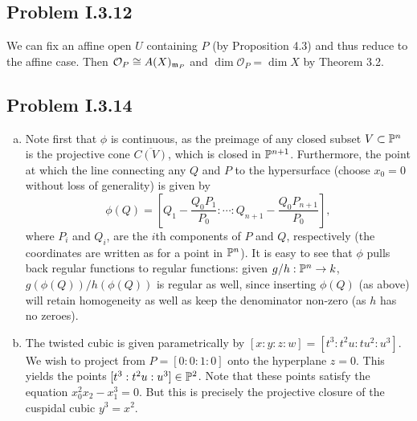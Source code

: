 \documentclass{mathnotes}
\begin{document}
\subsection*{Problem I.3.12}
We can fix an affine open $U$ containing $P$ (by Proposition 4.3) and thus reduce to the affine case.
Then $\mathcal{O}_P\cong A(X)_{\mathfrak m_P}$ and $\dim \mathcal{O}_P=\dim X$ by Theorem 3.2.


\subsection*{Problem I.3.14}
\begin{enumerate}[(a)]
    \item Note first that $\phi$ is continuous, as the preimage of any closed subset $V\subset \mathbb{P}^n$
        is the projective cone $\overline{C(V)}$, which is closed in $\mathbb{P}^{n+1}$. 
        Furthermore, the point at which the line connecting any $Q$ and $P$ to the hypersurface
        (choose $x_0=0$ without loss of generality) is given by 
        \[\phi(Q)=[Q_1-\frac{Q_0P_1}{P_0}:\cdots:Q_{n+1}-\frac{Q_0P_{n+1}}{P_0}],\]
        where $P_i$ and $Q_i$, are the $i$th components of $P$ and $Q$, respectively (the coordinates
        are written as for a point in $\mathbb{P}^n$).
        It is easy to see that $\phi$
        pulls back regular functions to regular functions: given $g/h:\mathbb{P}^n\to k$, $g(\phi(Q))/h(\phi(Q))$
        is regular as well, since inserting $\phi(Q)$ (as above) will retain homogeneity as well as
        keep the denominator non-zero (as $h$ has no zeroes).
    \item The twisted cubic is given parametrically by $[x:y:z:w]=[t^3:t^2u:tu^2:u^3]$. We wish
        to project from $P=[0:0:1:0]$ onto the hyperplane $z=0$. This yields the points
        $[t^3:t^2u:u^3]\in\mathbb{P}^2$. Note that these points satisfy the equation $x_0^2x_2-x_1^3=0$.
        But this is precisely the projective closure of the cuspidal cubic $y^3=x^2$.
\end{enumerate}
\end{document}
